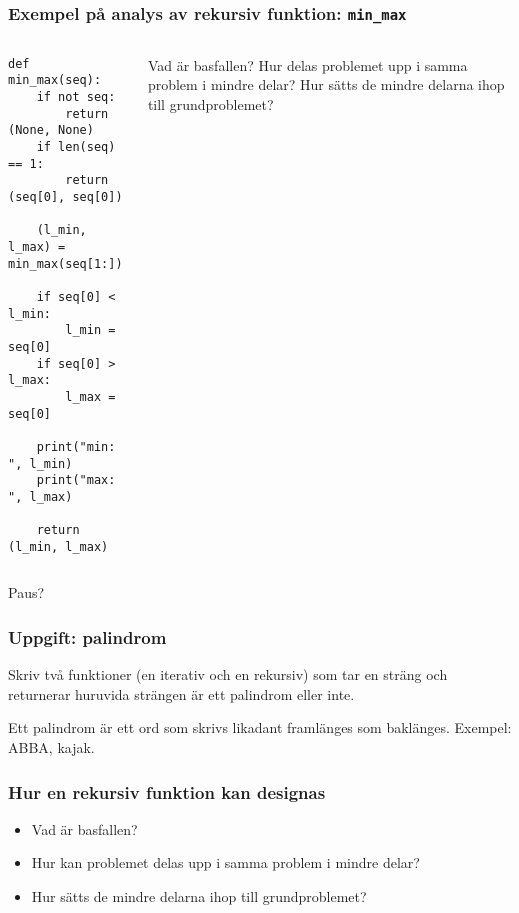 \documentclass{beamer}
\begin{document}
  \begin{frame}[fragile]
    \frametitle{Exempel på analys av rekursiv funktion: \texttt{min\_max}}

    \begin{columns}
      \begin{column}{0.48\textwidth}
        \begin{verbatim}
def min_max(seq):
    if not seq:
        return (None, None)
    if len(seq) == 1:
        return (seq[0], seq[0])

    (l_min, l_max) = min_max(seq[1:])

    if seq[0] < l_min:
        l_min = seq[0]
    if seq[0] > l_max:
        l_max = seq[0]

    print("min: ", l_min)
    print("max: ", l_max)

    return (l_min, l_max)
        \end{verbatim}

      \end{column}%
      \begin{column}{0.48\textwidth}
         {Vad är basfallen?}%
         {Hur delas problemet upp i samma problem i mindre delar?}%
         {Hur sätts de mindre delarna ihop till grundproblemet?}%
      \end{column}
    \end{columns}

  \end{frame}

  \begin{frame}

    \begin{center}
      \Huge Paus?
    \end{center}

  \end{frame}

  \begin{frame}[fragile]
    \frametitle{Uppgift: palindrom}

    Skriv två funktioner (en iterativ och en rekursiv) som tar en sträng och
    returnerar huruvida strängen är ett palindrom eller inte.

    Ett palindrom är ett ord som skrivs likadant framlänges som baklänges.
    Exempel: ABBA, kajak.

  \end{frame}

  \begin{frame}
    \frametitle{Hur en rekursiv funktion kan designas}

    \begin{itemize}
      \item Vad är basfallen?
      \item Hur kan problemet delas upp i samma problem i mindre delar?
      \item Hur sätts de mindre delarna ihop till grundproblemet?
    \end{itemize}
  \end{frame}
\end{document}
